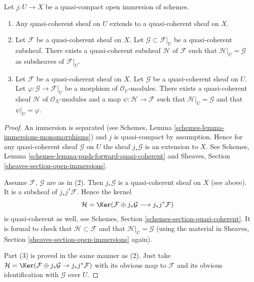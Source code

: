 \begin{lemma}
\label{lemma-extend-trivial}
Let $j : U \to X$ be a quasi-compact open immersion of schemes.
\begin{enumerate}
\item Any quasi-coherent sheaf on $U$ extends to a quasi-coherent
sheaf on $X$.
\item Let $\mathcal{F}$ be a quasi-coherent sheaf on $X$.
Let $\mathcal{G} \subset \mathcal{F}|_U$ be a quasi-coherent
subsheaf. There exists a quasi-coherent subsheaf $\mathcal{H}$ of
$\mathcal{F}$ such that $\mathcal{H}|_U = \mathcal{G}$
as subsheaves of $\mathcal{F}|_U$.
\item Let $\mathcal{F}$ be a quasi-coherent sheaf on $X$.
Let $\mathcal{G}$ be a quasi-coherent sheaf on $U$.
Let $\varphi : \mathcal{G} \to \mathcal{F}|_U$ be a morphism
of $\mathcal{O}_U$-modules. There exists a quasi-coherent sheaf $\mathcal{H}$
of $\mathcal{O}_X$-modules and a map $\psi : \mathcal{H} \to \mathcal{F}$
such that $\mathcal{H}|_U = \mathcal{G}$ and that
$\psi|_U = \varphi$.
\end{enumerate}
\end{lemma}

\begin{proof}
An immersion is separated
(see Schemes, Lemma \ref{schemes-lemma-immersions-monomorphisms})
and $j$ is quasi-compact by assumption.
Hence for any quasi-coherent sheaf $\mathcal{G}$ on $U$ the sheaf
$j_*\mathcal{G}$ is an extension to $X$. See
Schemes, Lemma \ref{schemes-lemma-push-forward-quasi-coherent} and
Sheaves, Section \ref{sheaves-section-open-immersions}.

\medskip\noindent
Assume $\mathcal{F}$, $\mathcal{G}$ are as in (2).
Then $j_*\mathcal{G}$ is a quasi-coherent sheaf on $X$ (see above).
It is a subsheaf of $j_*j^*\mathcal{F}$.
Hence the kernel
$$
\mathcal{H} =
\Ker(\mathcal{F} \oplus j_* \mathcal{G}
\longrightarrow j_*j^*\mathcal{F})
$$
is quasi-coherent as well, see
Schemes, Section \ref{schemes-section-quasi-coherent}.
It is formal to check that $\mathcal{H} \subset \mathcal{F}$ and that
$\mathcal{H}|_U = \mathcal{G}$ (using the material in
Sheaves, Section \ref{sheaves-section-open-immersions} again).

\medskip\noindent
Part (3) is proved in the same manner as (2). Just take
$\mathcal{H} = \Ker(\mathcal{F} \oplus j_* \mathcal{G}
\to j_*j^*\mathcal{F})$ with its obvious map to $\mathcal{F}$
and its obvious identification with $\mathcal{G}$ over $U$.
\end{proof}
